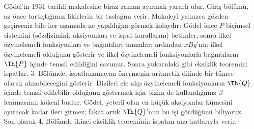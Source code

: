 \documentclass[../../../include/open-logic-section]{subfiles}
\begin{document}


G\"odel'in 1931 tarihli makalesine biraz zaman ayırmak yararlı olur. Giriş
bölümü, az önce tartıştığımız fikirlerin bir taslağını verir. Makaleyi yalnızca
gözden geçirseniz bile her aşamada ne yapıldığını görmek kolaydır: G\"odel
önce $P$ biçimsel sistemini (sözdizimini, aksiyomları ve ispat kurallarını)
betimler; sonra ilkel özyinelemeli fonksiyonları ve bağıntıları tanımlar;
ardından $x B y$'nin ilkel özyinelemeli olduğunu gösterir ve ilkel
özyinelemeli fonksiyonlarla bağıntıların $\Th{P}$ içinde temsil edildiğini
savunur. Sonra yukarıdaki gibi eksiklik teoremini ispatlar. 3. Bölümde,
ispatlanamayan önermenin aritmetik dilinde bir tümce olarak alınabileceğini
gösterir. Dizileri ele alıp özyinelemeli fonksiyonların $\Th{Q}$ içinde temsil
edilebilir olduğunu göstermek için bizim de kullandığımız $\beta$-lemmasının
kökeni budur. G\"odel, yeterli olan en küçük aksiyomlar kümesini ayıracak kadar
ileri gitmez; fakat artık $\Th{Q}$'nun bu işi gördüğünü biliyoruz. Son olarak
4. Bölümde ikinci eksiklik teoreminin ispatını ana hatlarıyla verir.
\end{document}
